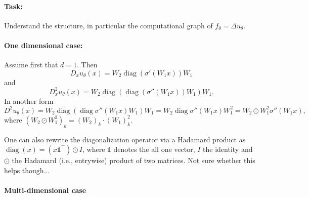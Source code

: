 \paragraph{Task: }
Understand the structure, in particular the computational graph of $f_\theta = \Delta u_\theta$.

\paragraph{One dimensional case: }
Assume first that $d=1$.
Then
\[ D_x u_\theta(x) = W_2 \operatorname{diag}(\sigma'(W_1 x)) W_1 \]
and
\[ D^2_x u_\theta(x) = W_2%
  \operatorname{diag}(\operatorname{diag}(\sigma''(W_1 x)) W_1)W_1. %
\]
In another form
\[D^2 u_\theta(x) = W_2 \operatorname{diag}(\operatorname{diag}\sigma''(W_1 x) W_1) W_1 = W_2 \operatorname{diag}\sigma''(W_1 x) W_1^2 = W_2\odot W_1^2 \sigma''(W_1x),
\]
where $(W_2\odot W_1^2)_k = (W_2)_k \cdot (W_1)_k^2$.

One can also rewrite the diagonalization operator via a Hadamard product as $\operatorname{diag}(x) = (x\mathds{1}^\top)\odot I$, where $\mathds{1}$ denotes the all one vector, $I$ the identity and $\odot$ the Hadamard (i.e., entrywise) product of two matrices.
Not sure whether this helps though...

\paragraph{Multi-dimensional case}

